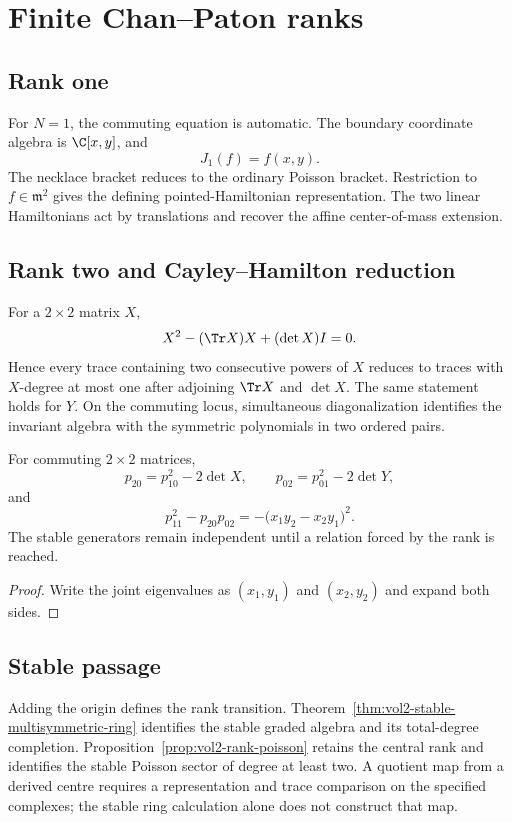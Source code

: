 \chapter{Finite Chan--Paton ranks}
\section{Rank one}
For $N=1$, the commuting equation is automatic.  The boundary coordinate algebra is $\C[x,y]$, and
\[
 J_1(f)=f(x,y).
\]
The necklace bracket reduces to the ordinary Poisson bracket.  Restriction to $f\in\mathfrak m^2$ gives the defining pointed-Hamiltonian representation.  The two linear Hamiltonians act by translations and recover the affine center-of-mass extension.

\section{Rank two and Cayley--Hamilton reduction}
For a $2\times2$ matrix $X$,
\[
 X^2-(\Tr X)X+(\det X)I=0.
\]
Hence every trace containing two consecutive powers of $X$ reduces to traces with $X$-degree at most one after adjoining $\Tr X$ and $\det X$.  The same statement holds for $Y$.  On the commuting locus, simultaneous diagonalization identifies the invariant algebra with the symmetric polynomials in two ordered pairs.

\begin{proposition}
For commuting $2\times2$ matrices,
\[
 p_{20}=p_{10}^2-2\det X,
 \qquad
 p_{02}=p_{01}^2-2\det Y,
\]
and
\[
 p_{11}^2-p_{20}p_{02}
 =-\bigl(x_1y_2-x_2y_1\bigr)^2.
\]
The stable generators remain independent until a relation forced by the rank is reached.
\end{proposition}
\begin{proof}
Write the joint eigenvalues as $(x_1,y_1)$ and $(x_2,y_2)$ and expand both sides.
\end{proof}

\section{Stable passage}
Adding the origin defines the rank transition.
Theorem~\ref{thm:vol2-stable-multisymmetric-ring} identifies the
stable graded algebra and its total-degree completion.
Proposition~\ref{prop:vol2-rank-poisson} retains the central rank
and identifies the stable Poisson sector of degree at least two.
A quotient map from a derived centre requires a representation
and trace comparison on the specified complexes; the stable
ring calculation alone does not construct that map.


